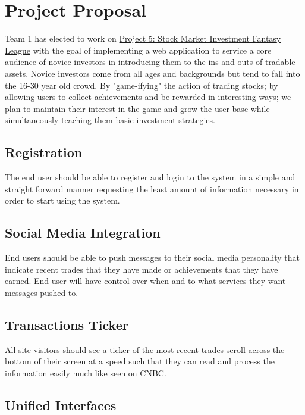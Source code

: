 \documentclass[11pt,letterpaper,oneside]{memoir}
\begin{document}
\chapter{Project Proposal}
\label{proposal}
Team 1 has elected to work on \href{http://ece.rutgers.edu/~marsic/books/SE/projects/}
{Project 5: Stock Market Investment Fantasy League} with the goal of implementing a
web application to service a core audience of novice investors in introducing them to
the ins and outs of tradable assets.  Novice investors come from all ages and backgrounds
but tend to fall into the 16-30 year old crowd.  By "game-ifying" the action of trading
stocks; by allowing users to collect achievements and be rewarded in interesting ways; we
plan to maintain their interest in the game and grow the user base while simultaneously
teaching them basic investment strategies.

\section{Registration}

The end user should be able to register and login to the system in a simple and straight forward
manner requesting the least amount of information necessary in order to start using the system.

\section{Social Media Integration}

End users should be able to push messages to their social media personality that indicate
recent trades that they have made or achievements that they have earned.  End
user will have control over when and to what services they want messages pushed
to.

\section{Transactions Ticker}

All site visitors should see a ticker of the most recent trades scroll across the
bottom of their screen at a speed such that they can read and process the
information easily much like seen on CNBC.

\section{Unified Interfaces}
\end{document}
